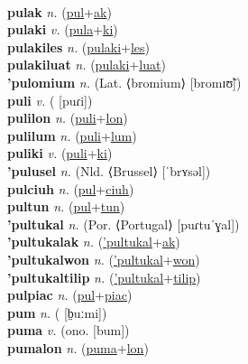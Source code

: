  \label{pulasapuluat} \\
\textbf{pulak} \textit{n.} (\hyperref[pul]{pul}+\hyperref[ak]{ak})
 \label{pulak} \\
\textbf{pulaki} \textit{v.} (\hyperref[pula]{pula}+\hyperref[ki]{ki})
 \label{pulaki} \\
\textbf{pulakiles} \textit{n.} (\hyperref[pulaki]{pulaki}+\hyperref[les]{les})
 \label{pulakiles} \\
\textbf{pulakiluat} \textit{n.} (\hyperref[pulaki]{pulaki}+\hyperref[luat]{luat})
 \label{pulakiluat} \\
\textbf{'pulomium} \textit{n.} (Lat. ⟨bromium⟩ [bromɪʊ̃])
 \label{'pulomium} \\
\textbf{puli} \textit{v.} ( [puɾi])
 \label{puli} \\
\textbf{pulilon} \textit{n.} (\hyperref[puli]{puli}+\hyperref[lon]{lon})
 \label{pulilon} \\
\textbf{pulilum} \textit{n.} (\hyperref[puli]{puli}+\hyperref[lum]{lum})
 \label{pulilum} \\
\textbf{puliki} \textit{v.} (\hyperref[puli]{puli}+\hyperref[ki]{ki})
 \label{puliki} \\
\textbf{'pulusel} \textit{n.} (Nld. ⟨Brussel⟩ [ˈbrʏsəl])
 \label{'pulusel} \\
\textbf{pulciuh} \textit{n.} (\hyperref[pul]{pul}+\hyperref[ciuh]{ciuh})
 \label{pulciuh} \\
\textbf{pultun} \textit{n.} (\hyperref[pul]{pul}+\hyperref[tun]{tun})
 \label{pultun} \\
\textbf{'pultukal} \textit{n.} (Por. ⟨Portugal⟩ [puɾtuˈɣal])
 \label{'pultukal} \\
\textbf{'pultukalak} \textit{n.} (\hyperref['pultukal]{'pultukal}+\hyperref[ak]{ak})
 \label{'pultukalak} \\
\textbf{'pultukalwon} \textit{n.} (\hyperref['pultukal]{'pultukal}+\hyperref[won]{won})
 \label{'pultukalwon} \\
\textbf{'pultukaltilip} \textit{n.} (\hyperref['pultukal]{'pultukal}+\hyperref[tilip]{tilip})
 \label{'pultukaltilip} \\
\textbf{pulpiac} \textit{n.} (\hyperref[pul]{pul}+\hyperref[piac]{piac})
 \label{pulpiac} \\
\textbf{pum} \textit{n.} ( [b̤uːmi])
 \label{pum} \\
\textbf{puma} \textit{v.} (ono. [bum])
 \label{puma} \\
\textbf{pumalon} \textit{n.} (\hyperref[puma]{puma}+\hyperref[lon]{lon})
